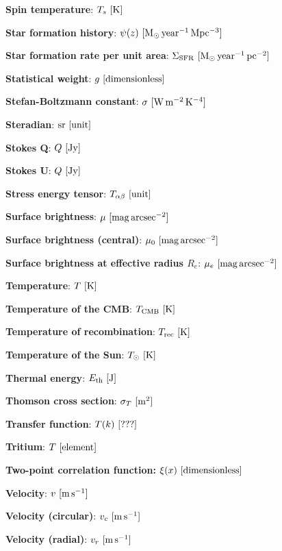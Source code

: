 \documentclass[a4paper,11pt]{article}
\begin{document}
{\noindent}\textbf{Spin temperature}: $T_s ~ [{\rm K}]$

{\noindent}\textbf{Star formation history}: $\psi(z) ~ [{\rm M_\odot\,year^{-1}\,Mpc^{-3}}]$

{\noindent}\textbf{Star formation rate per unit area}: $\Sigma_\mathrm{SFR} ~ [{\rm M_\odot\,year^{-1}\,pc^{-2}}]$

{\noindent}\textbf{Statistical weight}: $g ~ [{\rm dimensionless}]$

{\noindent}\textbf{Stefan-Boltzmann constant}: $\sigma ~ [{\rm W\,m^{-2}\,K^{-4}}]$

{\noindent}\textbf{Steradian}: ${\rm sr} ~ [{\rm unit}]$

{\noindent}\textbf{Stokes Q}: $Q ~ [{\rm Jy}]$

{\noindent}\textbf{Stokes U}: $Q ~ [{\rm Jy}]$

{\noindent}\textbf{Stress energy tensor}: $T_{\alpha\beta} ~ [{\rm unit}]$

{\noindent}\textbf{Surface brightness}: $\mu ~ [{\rm mag\,arcsec^{-2}}]$

{\noindent}\textbf{Surface brightness (central)}: $\mu_0 ~ [{\rm mag\,arcsec^{-2}}]$

{\noindent}\textbf{Surface brightness at effective radius $R_e$}: $\mu_e ~ [{\rm mag\,arcsec^{-2}}]$

{\noindent}\textbf{Temperature}: $T ~ [{\rm K}]$

{\noindent}\textbf{Temperature of the CMB}: $T_{\rm CMB} ~ [{\rm K}]$

{\noindent}\textbf{Temperature of recombination}: $T_{\rm rec} ~ [{\rm K}]$

{\noindent}\textbf{Temperature of the Sun}: $T_\odot ~ [{\rm K}]$

{\noindent}\textbf{Thermal energy}: $E_\mathrm{th} ~ [{\rm J}]$

{\noindent}\textbf{Thomson cross section}: $\sigma_T ~ [{\rm m^2}]$

{\noindent}\textbf{Transfer function}: $T(k) ~ [{\rm ???}]$

{\noindent}\textbf{Tritium}: $T ~ [{\rm element}]$

{\noindent}\textbf{Two-point correlation function:} $\xi(x) ~ [{\rm dimensionless}]$

{\noindent}\textbf{Velocity}: $v ~ [{\rm m\,s^{-1}}]$

{\noindent}\textbf{Velocity (circular)}: $v_c ~ [{\rm m\,s^{-1}}]$

{\noindent}\textbf{Velocity (radial)}: $v_r ~ [{\rm m\,s^{-1}}]$
\end{document}
